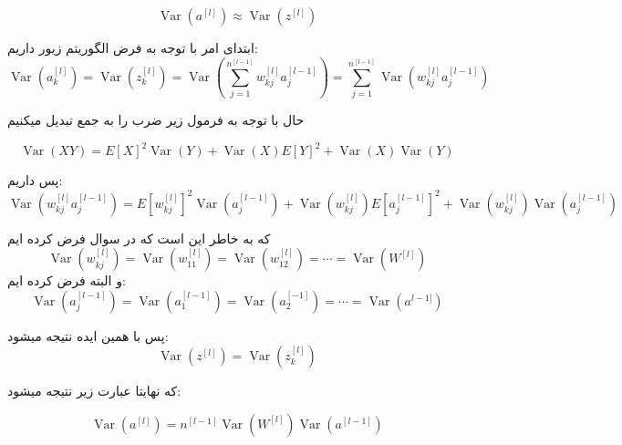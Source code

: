 \documentclass{article}[12pt]
\begin{document}
\begin{equation*}
	\operatorname{Var}\left(a^{[l]}\right) \approx \operatorname{Var}\left(z^{[l]}\right)
\end{equation*} 

ابتدای امر با توجه به فرض الگوریتم زیور داریم:
\begin{equation*}
	\operatorname{Var}\left(a_{k}^{[l]}\right)=\operatorname{Var}\left(z_{k}^{[l]}\right)=\operatorname{Var}\left(\sum_{j=1}^{n^{[l-1]}} w_{k j}^{[l]} a_{j}^{[l-1]}\right)=\sum_{j=1}^{n^{[l-1]}} \operatorname{Var}\left(w_{k j}^{[l]} a_{j}^{[l-1]}\right)
\end{equation*}

حال با توجه به فرمول زیر ضرب را به جمع تبدیل میکنیم

\begin{equation*}
	\operatorname{Var}(X Y)=E[X]^{2} \operatorname{Var}(Y)+\operatorname{Var}(X) E[Y]^{2}+\operatorname{Var}(X) \operatorname{Var}(Y)
\end{equation*}

پس داریم:
\begin{equation*}
	\operatorname{Var}\left(w_{k j}^{[l]} a_{j}^{[l-1]}\right)=E\left[w_{k j}^{[l]}\right]^{2} \operatorname{Var}\left(a_{j}^{[l-1]}\right)+\operatorname{Var}\left(w_{k j}^{[l]}\right) E\left[a_{j}^{[l-1]}\right]^{2}+\operatorname{Var}\left(w_{k j}^{[l]}\right) \operatorname{Var}\left(a_{j}^{[l-1]}\right)
\end{equation*}

که به خاطر این است که در سوال فرض کرده ایم
\begin{equation*}
	\operatorname{Var}\left(w_{k j}^{[l]}\right)=\operatorname{Var}\left(w_{11}^{[l]}\right)=\operatorname{Var}\left(w_{12}^{[l]}\right)=\cdots=\operatorname{Var}\left(W^{[l]}\right)
\end{equation*}
و البته فرض کرده ایم:
\begin{equation*}
	\operatorname{Var}\left(a_{j}^{[l-1]}\right)=\operatorname{Var}\left(a_{1}^{[l-1]}\right)=\operatorname{Var}\left(a_{2}^{[-1]}\right)=\cdots=\operatorname{Var}\left(a^{l-1]}\right)
\end{equation*}

پس با همین ایده نتیجه میشود:
\begin{equation*}
	\operatorname{Var}\left(z^{[l]}\right)=\operatorname{Var}\left(z_{k}^{[l]}\right)
\end{equation*}

که نهایتا عبارت زیر نتیجه میشود:

\begin{equation*}
	\operatorname{Var}\left(a^{[l]}\right)=n^{[l-1]} \operatorname{Var}\left(W^{[l]}\right) \operatorname{Var}\left(a^{[l-1]}\right)
\end{equation*}
\end{document}
